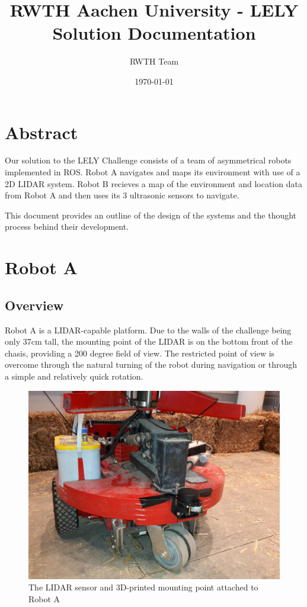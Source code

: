 \documentclass[11pt]{article}
\title{RWTH Aachen University - LELY Solution Documentation}
\author{RWTH Team}
\date{\today}
\begin{document}
	\maketitle	
	
	\section{Abstract}
	
	Our solution to the LELY Challenge consists of a team of asymmetrical robots implemented in ROS. Robot A navigates and maps its environment with use of a 2D LIDAR system. Robot B recieves a map of the environment and location data from Robot A and then uses its 3 ultrasonic sensors to navigate. \newline
	
	This document provides an outline of the design of the systems and the thought process behind their development.	
	
	\section{Robot A}
	
	\subsection{Overview}
	Robot A is a LIDAR-capable platform. Due to the walls of the challenge being only 37cm tall, the mounting point of the LIDAR is on the bottom front of the chasis, providing a 200 degree field of view. The restricted point of view is overcome through the natural turning of the robot during navigation or through a simple and relatively quick rotation.
	
	\begin{figure}[h!]
		\centering
		\includegraphics[scale=0.1]{robot_a}
		\caption{The LIDAR sensor and 3D-printed mounting point attached to Robot A}
	\end{figure}
	
\end{document}
